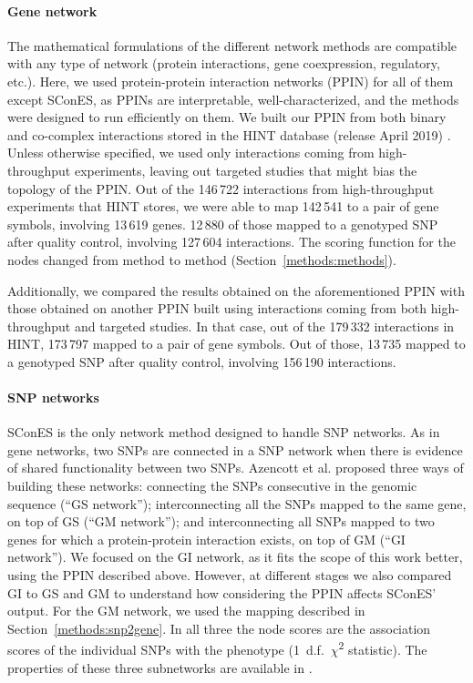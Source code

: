 \documentclass[10pt,letterpaper]{article}
\begin{document}
\paragraph{Gene network}
The mathematical formulations of the different network methods are compatible with any type of network (protein interactions, gene coexpression, regulatory, etc.). Here, we used protein-protein interaction networks (PPIN) for all of them except SConES, as PPINs are interpretable, well-characterized, and the methods were designed to run efficiently on them. We built our PPIN from both binary and co-complex interactions stored in the HINT database (release April 2019) \cite{das_hint:_2012}. Unless otherwise specified, we used only interactions coming from high-throughput experiments, leaving out targeted studies that might bias the topology of the PPIN. Out of the 146\,722 interactions from high-throughput experiments that HINT stores, we were able to map 142\,541 to a pair of gene symbols, involving 13\,619 genes. 12\,880 of those mapped to a genotyped SNP after quality control, involving 127\,604 interactions. The scoring function for the nodes changed from method to method (Section~\ref{methods:methods}).

Additionally, we compared the results obtained on the aforementioned PPIN with those obtained on another PPIN built using interactions coming from both high-throughput and targeted studies. In that case, out of the 179\,332 interactions in HINT, 173\,797 mapped to a pair of gene symbols. Out of those, 13\,735 mapped to a genotyped SNP after quality control, involving 156\,190 interactions.

\paragraph{SNP networks}
SConES \cite{azencott_efficient_2013} is the only network method designed to handle SNP networks. As in gene networks, two SNPs are connected in a SNP network when there is evidence of shared functionality between two SNPs. Azencott et al. \cite{azencott_efficient_2013} proposed three ways of building these networks: connecting the SNPs consecutive in the genomic sequence (``GS network''); interconnecting all the SNPs mapped to the same gene, on top of GS (``GM network''); and interconnecting all SNPs mapped to two genes for which a protein-protein interaction exists, on top of GM (``GI network''). We focused on the GI network, as it fits the scope of this work better, using the PPIN described above. However, at different stages we also compared GI to GS and GM to understand how considering the PPIN affects SConES' output. For the GM network, we used the mapping described in Section~\ref{methods:snp2gene}. In all three the node scores are the association scores of the individual SNPs with the phenotype (1~d.f.~\(\chi\)\textsuperscript{2} statistic). The properties of these three subnetworks are available in .
\end{document}
